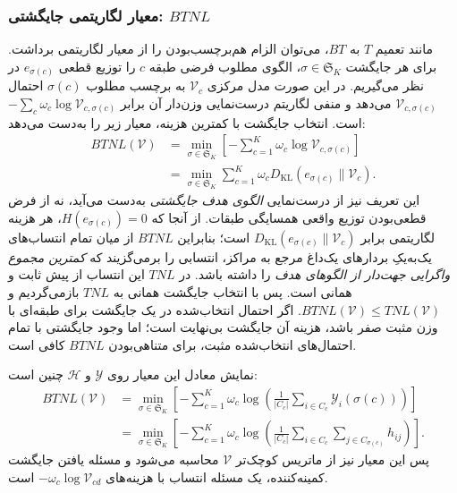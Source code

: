\subsubsection{معیار لگاریتمی جایگشتی: \texorpdfstring{$BTNL$}{BTNL}}
\label{cmp:subsubsec:ch3-BTNL}
مانند تعمیم $T$ به $BT$، می‌توان الزام هم‌برچسب‌بودن را از معیار لگاریتمی برداشت. برای هر جایگشت $\sigma\in \mathfrak{S}_K$، الگوی مطلوب فرضی طبقه $c$ را توزیع قطعی $e_{\sigma(c)}$ در نظر می‌گیریم. در این صورت مدل مرکزی $\mathcal V_c$ به برچسب مطلوب $\sigma(c)$ احتمال $\mathcal V_{c,\sigma(c)}$ می‌دهد و منفی لگاریتم درست‌نمایی وزن‌دار آن برابر $-\sum_c\omega_c\log\mathcal V_{c,\sigma(c)}$ است. انتخاب جایگشت با کمترین هزینه، معیار زیر را به‌دست می‌دهد:
\begin{equation}\label{cmp:eq:ch3-BTNL-on-V}
\boxed{
\begin{aligned}
BTNL(\mathcal V)
&=\min_{\sigma\in \mathfrak{S}_K}
\left[-\sum_{c=1}^{K}\omega_c
\log\mathcal V_{c,\sigma(c)}\right]\\
&=\min_{\sigma\in \mathfrak{S}_K}
\sum_{c=1}^{K}\omega_c
D_{\mathrm{KL}}(e_{\sigma(c)}\|\mathcal V_c).
\end{aligned}}
\end{equation}
این تعریف نیز از درست‌نمایی \emph{الگوی هدف جایگشتی}
به‌دست می‌آید، نه از فرض قطعی‌بودن
توزیع واقعی همسایگی طبقات.
از آنجا که $H(e_{\sigma(c)})=0$،
هر هزینه لگاریتمی برابر
$D_{\mathrm{KL}}(e_{\sigma(c)}\|\mathcal V_c)$
است؛ بنابراین $BTNL$ از میان
تمام انتساب‌های یک‌به‌یکِ بردارهای
یک‌داغ مرجع به مراکز، انتسابی را
برمی‌گزیند که \emph{کمترین مجموع
واگرایی جهت‌دار از الگوهای هدف}
را داشته باشد. در $TNL$ این انتساب
از پیش ثابت و همانی است.
پس با انتخاب جایگشت همانی
به $TNL$ بازمی‌گردیم و
$BTNL(\mathcal V)\le TNL(\mathcal V)$.
اگر احتمال انتخاب‌شده در یک جایگشت
برای طبقه‌ای با وزن مثبت صفر باشد،
هزینه آن جایگشت بی‌نهایت است؛
اما وجود جایگشتی با تمام احتمال‌های
انتخاب‌شده مثبت، برای متناهی‌بودن
$BTNL$ کافی است.

نمایش معادل این معیار روی $\mathscr Y$ و $\mathscr H$ چنین است:
\begin{equation}\label{cmp:eq:ch3-BTNL-on-Y-H}
\begin{aligned}
BTNL(\mathcal V)
&=\min_{\sigma\in \mathfrak{S}_K}
\left[-\sum_{c=1}^{K}\omega_c\log
\left(\frac{1}{|C_c|}
\sum_{i\in C_c}\mathscr Y_i(\sigma(c))\right)\right]\\
&=\min_{\sigma\in \mathfrak{S}_K}
\left[-\sum_{c=1}^{K}\omega_c\log
\left(\frac{1}{|C_c|}
\sum_{i\in C_c}\sum_{j\in C_{\sigma(c)}}h_{ij}\right)\right].
\end{aligned}
\end{equation}
پس این معیار نیز از ماتریس کوچک‌تر $\mathcal V$ محاسبه می‌شود و مسئله یافتن جایگشت کمینه‌کننده، یک مسئله انتساب با هزینه‌های $-\omega_c\log\mathcal V_{cd}$ است.

